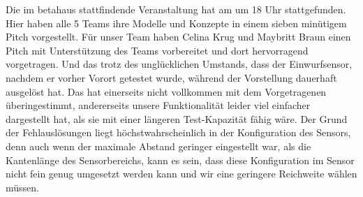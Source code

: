     Die im betahaus stattfindende Veranstaltung hat am  um 18 Uhr stattgefunden. Hier haben alle 5 Teams ihre Modelle und Konzepte in einem sieben minütigem Pitch vorgestellt. Für unser Team haben Celina Krug und Maybritt Braun einen Pitch mit Unterstützung des Teams vorbereitet und dort hervorragend vorgetragen. Und das trotz des unglücklichen Umstands, dass der Einwurfsensor, nachdem er vorher Vorort getestet wurde, während der Vorstellung dauerhaft ausgelöst hat. Das hat einerseits nicht vollkommen mit dem Vorgetragenen überingestimmt, andererseits unsere Funktionalität leider viel einfacher dargestellt hat, als sie mit einer längeren Test-Kapazität fähig wäre.
    Der Grund der Fehlauslösungen liegt höchstwahrscheinlich in der Konfiguration des Sensors, denn auch wenn der maximale Abstand geringer eingestellt war, als die Kantenlänge des Sensorbereichs, kann es sein, dass diese Konfiguration im Sensor nicht fein genug umgesetzt werden kann und wir eine geringere Reichweite wählen müssen.
        
